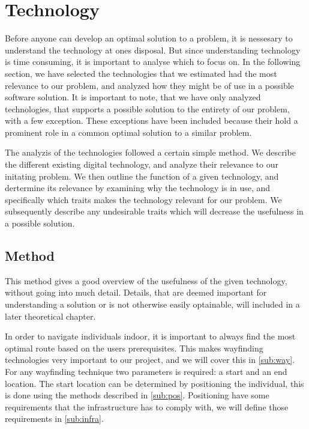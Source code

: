 
\section{Technology} \label{tech}

Before anyone can develop an optimal solution to a problem, it is nessesary to understand the technology at ones disposal. But since understanding technology is time consuming, it is important to analyse which to focus on. In the following section, we have selected the technologies that we estimated had the most relevance to our problem, and analyzed how they might be of use in a possible software solution. It is important to note, that we have only analyzed technologies, that supports a possible solution to the entirety of our problem, with a few exception. These exceptions have been included because their hold a prominent role in a common optimal solution to a similar problem.

The analyzis of the technologies followed a certain simple method. We describe the different existing digital technology, and analyze their relevance to our initating problem. We then outline the function of a given technology, and dertermine its relevance by examining why the technology is in use, and specifically which traits makes the technology relevant for our problem. We subsequently describe any undesirable traits which will decrease the usefulness in a possible solution.

\subsection{Method} \label{sub:techmethod}
This method gives a good overview of the usefulness of the given technology, without going into much detail. Details, that are deemed important for understanding a solution or is not otherwise easily optainable, will included in a later theoretical chapter.

In order to navigate individuals indoor, it is important to always find the most optimal route based on the users prerequisites. This makes wayfinding technologies very important to our project, and we will cover this in \cref{sub:way}. For any wayfinding technique two parameters is required: a start and an end location. The start location can be determined by positioning the individual, this is done using the methods described in \cref{sub:pos}. Positioning have some requirements that the infrastructure has to comply with, we will define those requirements in \cref{sub:infra}.


